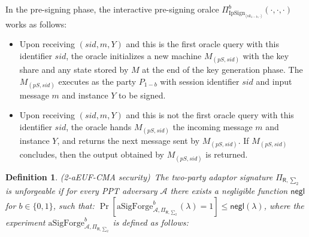 \documentclass{llncs}
\newtheorem{Definition}{Definition}
\begin{document}
In the pre-signing phase, the interactive pre-signing oralce $\Pi^b_{\text{IpSign}_{\langle sk_{1-b},\cdot \rangle}}(\cdot,\cdot,\cdot)$ works as follows:

\begin{itemize}
\item Upon receiving $(sid,m,Y)$  and this is the first oracle query with this identifier $sid$, the oracle initializes a new machine $M_{(pS,sid)}$ with the key share and any state stored by $M$ at the end of the key generation phase. The $M_{(pS,sid)}$ executes as the party $P_{1-b}$ with session identifier $sid$ and input message $m$ and instance $Y$ to be signed.  
\item Upon receiving $(sid,m,Y)$  and this is not the first oracle query with this identifier $sid$, the oracle hands $M_{(pS,sid)}$ the incoming message $m$ and instance $Y$, and returns the next message sent by $M_{(pS,sid)}$. If $M_{(pS,sid)}$ concludes, then the output obtained by $M_{(pS,sid)}$ is returned.
\end{itemize}

\begin{Definition}\emph{(2-aEUF-CMA security)}~\label{2-aEUF-CMA security}
The two-party adaptor signature $\Pi_{\mathsf{R},\sum_2}$ is unforgeable if for every PPT adversary $\mathcal{A}$ there exists a negligible function $\mathsf{negl}$ for $b\in\{0,1\}$, such that: $\Pr[\text{aSigForge}^b_{\mathcal{A},\Pi_{\mathsf{R},\sum_2}}(\lambda) = 1] \leq \mathsf{negl}(\lambda)$, where the experiment $\text{aSigForge}^b_{\mathcal{A},\Pi_{\mathsf{R},\sum_2}}$ is defined as follows:
\end{Definition}
\end{document}
